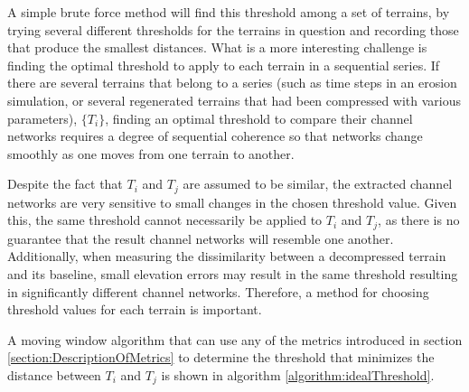 A simple brute force method will find this threshold among a set of terrains, by trying several different thresholds for the terrains in question and recording those that produce the smallest distances.
What is a more interesting challenge is finding the optimal threshold to apply to each terrain in a sequential series. 
If there are several terrains that belong to a series (such as time steps in an erosion simulation, or several regenerated terrains that had been compressed with various parameters), $\{ T_{i} \}$, finding an optimal threshold to compare their channel networks requires a degree of sequential coherence so that networks change smoothly as one moves from one terrain to another.
% 
% 

Despite the fact that $T_{i}$ and $T_{j}$ are assumed to be similar, the extracted channel networks are very sensitive to small changes in the chosen threshold value. Given this, the same threshold cannot necessarily be applied to $T_{i}$ and $T_{j}$, as there is no guarantee that the result channel networks will resemble one another.
Additionally, when measuring the dissimilarity between a decompressed terrain and its baseline, small elevation errors may result in the same threshold resulting in significantly different channel networks. Therefore, a method for choosing threshold values for each terrain is important. 

A moving window algorithm that can use any of the metrics introduced in section \ref{section:DescriptionOfMetrics} to determine the threshold that minimizes the distance between $T_{i}$ and $T_{j}$ is shown in algorithm \ref{algorithm:idealThreshold}.


